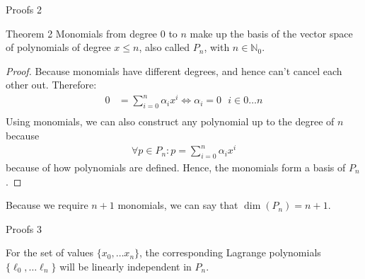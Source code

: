 \documentclass[8pt]{beamer}
\begin{document}
	\begin{frame}{Proofs 2}
		\begin{block}{Theorem 2}
			Monomials from degree $0$ to $n$ make up the basis of the vector space of polynomials of degree $x \leq n$, also called $P_n$, with $n \in \mathbb{N}_0$.
		\end{block}
		\begin{proof}
			Because monomials have different degrees, and hence can't cancel each other out. Therefore: 
			\begin{align*}
				0 &= \sum_{i=0}^{n}\alpha_i x^i \Leftrightarrow \alpha_i = 0 \text{   } i \in 0 \ldots n \\
			\end{align*}
			Using monomials, we can also construct any polynomial up to the degree of $n$ because
			\begin{align*}
				\forall p \in P_n : p = \sum_{i=0}^{n}\alpha_i x^i 
			\end{align*}
			because of how polynomials are defined. Hence, the monomials form a basis of $P_n$.
		\end{proof}
		Because we require $n+1$ monomials, we can say that $\dim(P_n) = n+1$.
		\end{frame}
					
		\begin{frame}{Proofs 3}
			\begin{theorem}
				For the set of values $\{x_0, \ldots x_n \}$, the corresponding Lagrange polynomials $\{\ell_0, \ldots \ell_n \}$ will be linearly independent in $P_n$.
			\end{theorem}
		\end{frame}
							
\end{document}
